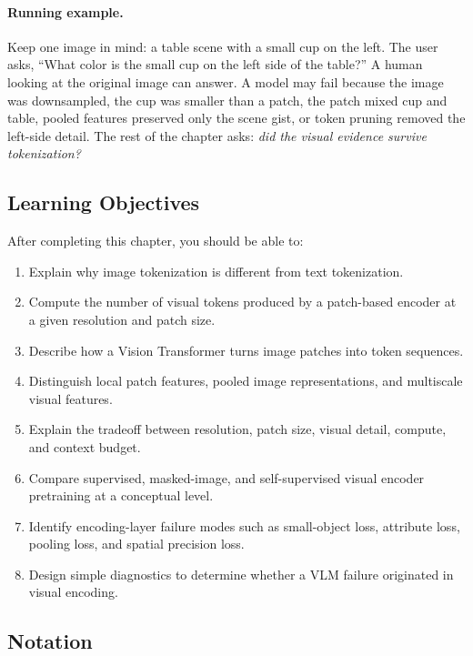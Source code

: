 \paragraph{Running example.} Keep one image in mind: a table scene with a small cup on the left. The user asks, ``What color is the small cup on the left side of the table?'' A human looking at the original image can answer. A model may fail because the image was downsampled, the cup was smaller than a patch, the patch mixed cup and table, pooled features preserved only the scene gist, or token pruning removed the left-side detail. The rest of the chapter asks: \emph{did the visual evidence survive tokenization?}

\subsection*{Learning Objectives}

After completing this chapter, you should be able to:

\begin{enumerate}
  \item Explain why image tokenization is different from text tokenization.
  \item Compute the number of visual tokens produced by a patch-based encoder at a given resolution and patch size.
  \item Describe how a Vision Transformer turns image patches into token sequences.
  \item Distinguish local patch features, pooled image representations, and multiscale visual features.
  \item Explain the tradeoff between resolution, patch size, visual detail, compute, and context budget.
  \item Compare supervised, masked-image, and self-supervised visual encoder pretraining at a conceptual level.
  \item Identify encoding-layer failure modes such as small-object loss, attribute loss, pooling loss, and spatial precision loss.
  \item Design simple diagnostics to determine whether a VLM failure originated in visual encoding.
\end{enumerate}

\subsection*{Notation}


